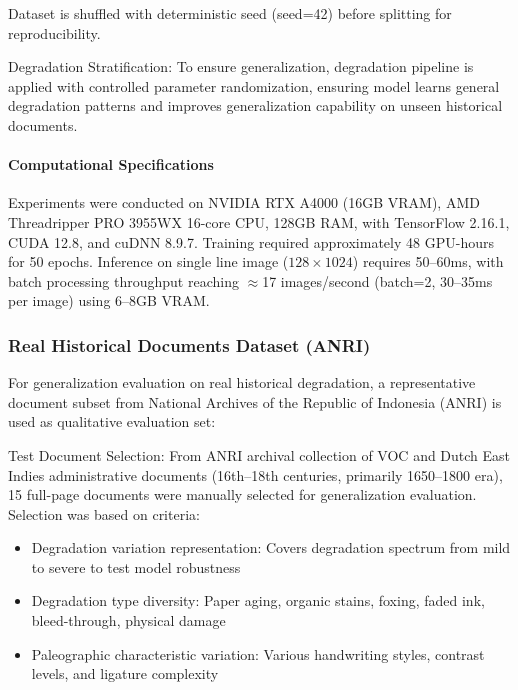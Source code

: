 \documentclass[journal]{IEEEtran}
\begin{document}
Dataset is shuffled with deterministic seed (seed=42) before splitting for reproducibility.

Degradation Stratification:
To ensure generalization, degradation pipeline is applied with controlled parameter randomization, ensuring model learns general degradation patterns and improves generalization capability on unseen historical documents.

\paragraph{Computational Specifications} Experiments were conducted on NVIDIA RTX A4000 (16GB VRAM), AMD Threadripper PRO 3955WX 16-core CPU, 128GB RAM, with TensorFlow 2.16.1, CUDA 12.8, and cuDNN 8.9.7. Training required approximately 48 GPU-hours for 50 epochs. Inference on single line image ($128\times1024$) requires 50--60ms, with batch processing throughput reaching $\approx$17 images/second (batch=2, 30--35ms per image) using 6--8GB VRAM.

\subsubsection{Real Historical Documents Dataset (ANRI)}

For generalization evaluation on real historical degradation, a representative document subset from National Archives of the Republic of Indonesia (ANRI) is used as qualitative evaluation set:

Test Document Selection: From ANRI archival collection of VOC and Dutch East Indies administrative documents (16th--18th centuries, primarily 1650--1800 era), 15 full-page documents were manually selected for generalization evaluation. Selection was based on criteria:
\begin{itemize}
    \item Degradation variation representation: Covers degradation spectrum from mild to severe to test model robustness
    \item Degradation type diversity: Paper aging, organic stains, foxing, faded ink, bleed-through, physical damage
    \item Paleographic characteristic variation: Various handwriting styles, contrast levels, and ligature complexity
\end{itemize}
\end{document}
